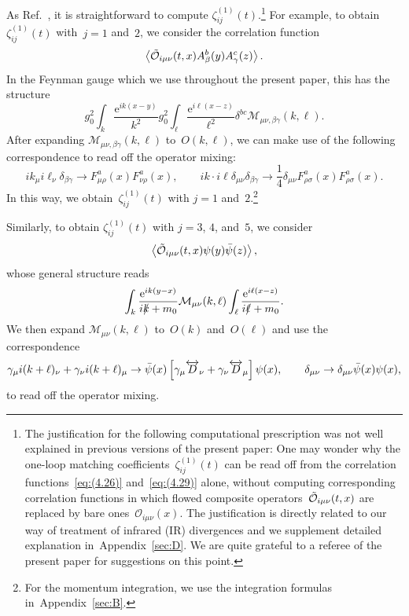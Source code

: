 As Ref.~\cite{Suzuki:2013gza}, it is straightforward to compute
$\zeta_{ij}^{(1)}(t)$.\footnote{The justification for the following
computational prescription was not well explained in previous versions of the
present paper: One may wonder why the one-loop matching
coefficients~$\zeta_{ij}^{(1)}(t)$ can be read off from the correlation
functions~\eqref{eq:(4.26)} and~\eqref{eq:(4.29)} alone, without computing
corresponding correlation functions in which flowed composite
operators~$\Tilde{\mathcal{O}}_{i\mu\nu}(t,x)$ are replaced by bare
ones~$\mathcal{O}_{i\mu\nu}(x)$. The justification is directly related to our
way of treatment of infrared (IR) divergences and we supplement detailed
explanation in~Appendix~\ref{sec:D}. We are quite grateful to a referee of the
present paper for suggestions on this point.} For example, to obtain
$\zeta_{ij}^{(1)}(t)$ with~$j=1$ and~$2$, we consider the correlation function
\begin{equation}
   \left\langle\Tilde{\mathcal{O}}_{i\mu\nu}(t,x)
   A_\beta^b(y)A_\gamma^c(z)\right\rangle.
\label{eq:(4.26)}
\end{equation}
In the Feynman gauge which we use throughout the present paper, this has the
structure
\begin{equation}
   g_0^2\int_k\frac{\mathrm{e}^{ik(x-y)}}{k^2}g_0^2\int_\ell\frac{\mathrm{e}^{i\ell(x-z)}}{\ell^2}
   \delta^{bc}\mathcal{M}_{\mu\nu,\beta\gamma}(k,\ell).
\label{eq:(4.27)}
\end{equation}
After expanding $\mathcal{M}_{\mu\nu,\beta\gamma}(k,\ell)$ to~$O(k,\ell)$, we can
make use of the following correspondence to read off the operator mixing:
\begin{equation}
   ik_\mu i\ell_\nu\delta_{\beta\gamma}\to F_{\mu\rho}^a(x)F_{\nu\rho}^a(x),\qquad
   ik\cdot i\ell\delta_{\mu\nu}\delta_{\beta\gamma}
   \to\frac{1}{4}\delta_{\mu\nu}F_{\rho\sigma}^a(x)F_{\rho\sigma}^a(x).
\label{eq:(4.28)}
\end{equation}
In this way, we obtain~$\zeta_{ij}^{(1)}(t)$ with $j=1$ and~$2$.\footnote{For
the momentum integration, we use the integration formulas
in~Appendix~\ref{sec:B}.}

Similarly, to obtain $\zeta_{ij}^{(1)}(t)$ with $j=3$, $4$, and~$5$, we consider
\begin{equation}
   \left\langle\Tilde{\mathcal{O}}_{i\mu\nu}(t,x)
   \psi(y)\Bar{\psi}(z)\right\rangle,
\label{eq:(4.29)}
\end{equation}
whose general structure reads
\begin{equation}
   \int_k\frac{\mathrm{e}^{ik(y-x)}}{i\Slash{k}+m_0}
   \mathcal{M}_{\mu\nu}(k,\ell)
   \int_\ell\frac{\mathrm{e}^{i\ell(x-z)}}{i\Slash{\ell}+m_0}.
\label{eq:(4.30)}
\end{equation}
We then expand $\mathcal{M}_{\mu\nu}(k,\ell)$ to~$O(k)$ and~$O(\ell)$ and use the
correspondence
\begin{equation}
   \gamma_\mu i(k+\ell)_\nu+\gamma_\nu i(k+\ell)_\mu\to
   \Bar{\psi}(x)\left[
   \gamma_\mu\overleftrightarrow{D}_\nu+\gamma_\nu\overleftrightarrow{D}_\mu
   \right]\psi(x),\qquad
   \delta_{\mu\nu}\to\delta_{\mu\nu}\Bar{\psi}(x)\psi(x),
\label{eq:(4.31)}
\end{equation}
to read off the operator mixing.

